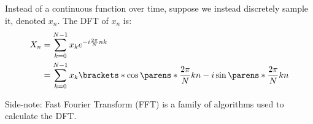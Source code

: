 \newpage
\begin{multicols}{2}

    \begin{CheatsheetEntryFrame}


        Instead of a continuous function over time, suppose we instead discretely sample it, denoted $x_n$. The DFT of $x_n$ is:
        \begin{align*}
            X_n
            &= \sum_{k=0}^{N-1} x_k e^{-i \frac{2 \pi}{N} n k}
            \\
            &= \sum_{k=0}^{N-1} x_k \brackets*{
                \cos\parens*{\frac{2 \pi}{N} k n}
                - i \sin\parens*{\frac{2 \pi}{N} k n}
            }
        \end{align*}

        {\footnotesize
            Side-note: Fast Fourier Transform (FFT) is a family of algorithms used to calculate the DFT.
        }


    \end{CheatsheetEntryFrame}
    
\end{multicols}

